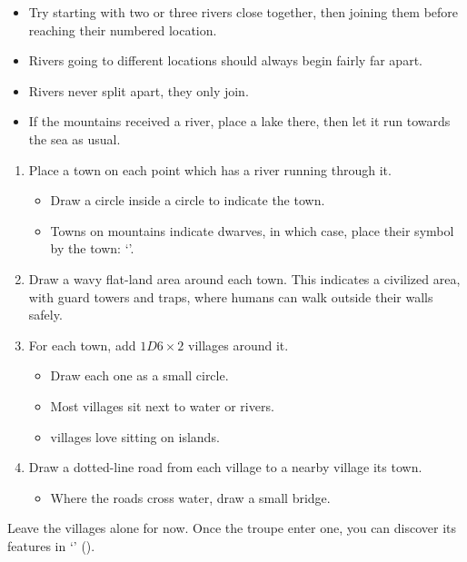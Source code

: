 \begin{multicols}{2}
\begin{itemize}
  \item
  Try starting with two or three rivers close together, then joining them before reaching their numbered location.
  \item
  Rivers going to different locations should always begin fairly far apart.
  \item
  Rivers never split apart, they only join.
  \item
  If the mountains received a river, place a lake there, then let it run towards the sea as usual.
\end{itemize}


\begin{enumerate}
  \item
  Place a town on each point which has a river running through it.
  \begin{itemize}
  \item
    Draw a circle inside a circle to indicate the town.
  \item
    Towns on mountains indicate dwarves, in which case, place their symbol by the town: `\Dw'.
  \end{itemize}
  \item
  Draw a wavy flat-land area around each town.
  This indicates a civilized area, with guard towers and traps, where humans can walk outside their walls safely.
  \item
  For each town, add $1D6 \times 2$ \glspl{village} around it.
  \begin{itemize}
    \item
    Draw each one as a small circle.
    \item
    Most \glspl{village} sit next to water or rivers.
    \item
    \Glspl{village} love sitting on islands.
  \end{itemize}
  \item
  Draw a dotted-line road from each \gls{village} to a nearby \gls{village} its town.
  \begin{itemize}
    \item
    Where the roads cross water, draw a small bridge.
  \end{itemize}
\end{enumerate}

Leave the \glspl{village} alone for now.
Once the troupe enter one, you can discover its features in `' ().


\end{multicols}
